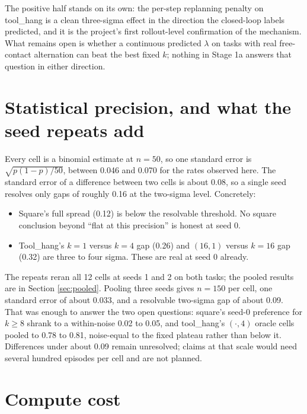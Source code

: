 \documentclass[11pt]{article}
\begin{document}
The positive half stands on its own: the per-step replanning penalty on tool\_hang
is a clean three-sigma effect in the direction the closed-loop labels predicted,
and it is the project's first rollout-level confirmation of the mechanism. What
remains open is whether a continuous predicted $\lambda$ on tasks with real
free-contact alternation can beat the best fixed $k$; nothing in Stage 1a answers
that question in either direction.

\section{Statistical precision, and what the seed repeats add}
\label{sec:stats}

Every cell is a binomial estimate at $n{=}50$, so one standard error is
$\sqrt{p(1-p)/50}$, between 0.046 and 0.070 for the rates observed here. The
standard error of a difference between two cells is about 0.08, so a single seed
resolves only gaps of roughly 0.16 at the two-sigma level. Concretely:

\begin{itemize}[leftmargin=1.4em]
\item Square's full spread (0.12) is below the resolvable threshold. No square
conclusion beyond ``flat at this precision'' is honest at seed 0.
\item Tool\_hang's $k{=}1$ versus $k{=}4$ gap (0.26) and $(16,1)$ versus $k{=}16$
gap (0.32) are three to four sigma. These are real at seed 0 already.
\end{itemize}

The repeats reran all 12 cells at seeds 1 and 2 on both tasks; the pooled results
are in Section \ref{sec:pooled}. Pooling three seeds gives $n{=}150$ per cell, one
standard error of about 0.033, and a resolvable two-sigma gap of about 0.09. That
was enough to answer the two open questions: square's seed-0 preference for
$k{\geq}8$ shrank to a within-noise 0.02 to 0.05, and tool\_hang's
$(\cdot,4)$ oracle cells pooled to 0.78 to 0.81, noise-equal to the fixed plateau
rather than below it. Differences under about 0.09 remain unresolved; claims at
that scale would need several hundred episodes per cell and are not planned.

\section{Compute cost}
\end{document}
